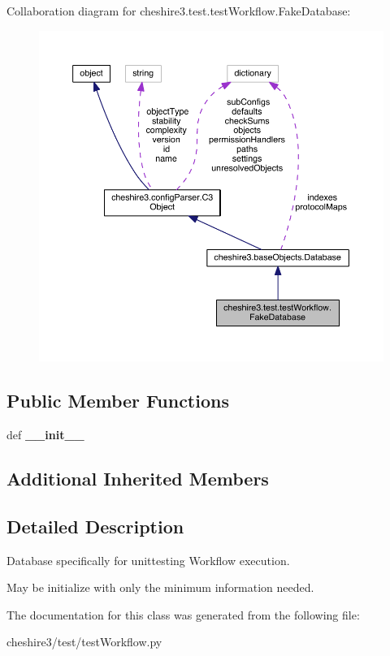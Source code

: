 Collaboration diagram for cheshire3.\-test.\-test\-Workflow.\-Fake\-Database\-:
\nopagebreak
\begin{figure}[H]
\begin{center}
\leavevmode
\includegraphics[width=350pt]{classcheshire3_1_1test_1_1test_workflow_1_1_fake_database__coll__graph}
\end{center}
\end{figure}
\subsection*{Public Member Functions}
\begin{DoxyCompactItemize}
\item 
\hypertarget{classcheshire3_1_1test_1_1test_workflow_1_1_fake_database_a7c18e578d99678866d336aba401457e2}{def {\bfseries \-\_\-\-\_\-init\-\_\-\-\_\-}}\label{classcheshire3_1_1test_1_1test_workflow_1_1_fake_database_a7c18e578d99678866d336aba401457e2}

\end{DoxyCompactItemize}
\subsection*{Additional Inherited Members}


\subsection{Detailed Description}
\begin{DoxyVerb}Database specifically for unittesting Workflow execution.

May be initialize with only the minimum information needed.
\end{DoxyVerb}
 

The documentation for this class was generated from the following file\-:\begin{DoxyCompactItemize}
\item 
cheshire3/test/test\-Workflow.\-py\end{DoxyCompactItemize}
